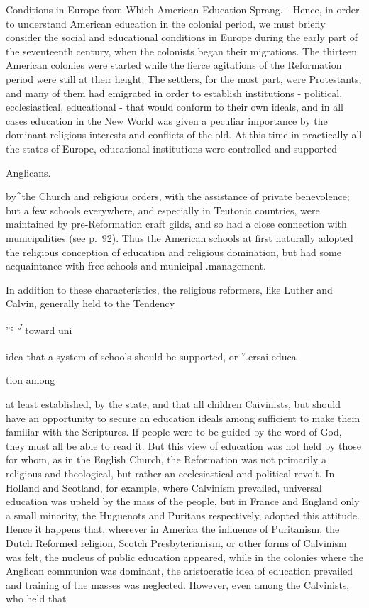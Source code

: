 \documentclass[]{book}
\begin{document}
Conditions in Europe from Which American Education Sprang. - Hence, in order to understand American education in the colonial period, we must briefly consider the social and educational conditions in Europe during the early part of the seventeenth century, when the colonists began their migrations. The thirteen American colonies were started while the fierce agitations of the Reformation period were still at their height. The settlers, for the most part, were Protestants, and many of them had emigrated in order to establish institutions - political, ecclesiastical, educational - that would conform to their own ideals, and in all cases education in the New World was given a peculiar importance by the dominant religious interests and conflicts of the old. At this time in practically all the states of Europe, educational institutions were controlled and supported

Anglicans.

by\^{}the Church and religious orders, with the assistance of private benevolence; but a few schools everywhere, and especially in Teutonic countries, were maintained by pre-Reformation craft gilds, and so had a close connection with municipalities (see p.~92). Thus the American schools at first naturally adopted the religious conception of education and religious domination, but had some acquaintance with free schools and municipal .management.

In addition to these characteristics, the religious reformers, like Luther and Calvin, generally held to the Tendency

''° \emph{\textsuperscript{J}} toward uni

idea that a system of schools should be supported, or \textsuperscript{v}.ersai educa

tion among

at least established, by the state, and that all children Caivinists, but should have an opportunity to secure an education ideals among sufficient to make them familiar with the Scriptures. If people were to be guided by the word of God, they must all be able to read it. But this view of education was not held by those for whom, as in the English Church, the Reformation was not primarily a religious and theological, but rather an ecclesiastical and political revolt. In Holland and Scotland, for example, where Calvinism prevailed, universal education was upheld by the mass of the people, but in France and England only a small minority, the Huguenots and Puritans respectively, adopted this attitude. Hence it happens that, wherever in America the influence of Puritanism, the Dutch Reformed religion, Scotch Presbyterianism, or other forms of Calvinism was felt, the nucleus of public education appeared, while in the colonies where the Anglican communion was dominant, the aristocratic idea of education prevailed and training of the masses was neglected. However, even among the Calvinists, who held that
\end{document}
